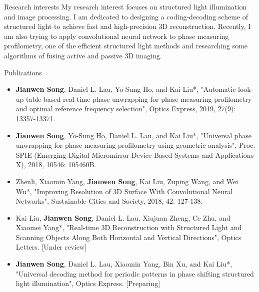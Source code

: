 \documentclass{resume} %
\begin{document}
\begin{rSection}{Research interests}
My research interest focuses on structured light illumination and image processing. I am dedicated to designing a coding-decoding scheme of structured light to achieve fast and high-precision 3D reconstruction. Recently, I am also trying to apply convolutional neural network to phase measuring profilometry, one of the efficient structured light methods and researching some algorithms of fusing active and passive 3D imaging.
\end{rSection}
\begin{rSection}{Publications}

\begin{itemize}[leftmargin=*]
\item {\bf Jianwen Song}, Daniel L. Lau, Yo-Sung Ho, and Kai Liu*, "Automatic look-up table based real-time phase unwrapping for phase measuring profilometry and optimal reference frequency selection", Optics Express, 2019, 27(9): 13357-13371.
\item {\bf Jianwen Song}, Yo-Sung Ho, Daniel L. Lau, and Kai Liu*, "Universal phase unwrapping for phase measuring profilometry using geometric analysis", Proc. SPIE (Emerging Digital Micromirror Device Based Systems and Applications X), 2018, 10546: 105460B.
\item Zhenli, Xiaomin Yang, {\bf Jianwen Song}, Kai Liu, Zuping Wang, and Wei Wu*, "Improving Resolution of 3D Surface With Convolutional Neural Networks", Sustainable Cities and Society, 2018, 42: 127-138.
\item Kai Liu, {\bf Jianwen Song}, Daniel L. Lau, Xiujuan Zheng, Ce Zhu, and Xiaomei Yang*, "Real-time 3D Reconstruction with Structured Light and Scanning Objects Along Both Horizontal and Vertical Directions", Optics Letters. [Under review]
\item {\bf Jianwen Song}, Daniel L. Lau, Xiaomin Yang, Bin Xu, and Kai Liu*, "Universal decoding method for periodic patterns in phase shifting structured light illumination", Optics Express. [Preparing]
\end{itemize}
\end{rSection}
\end{document}
